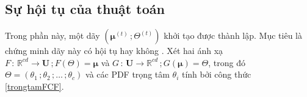 \documentclass[a4paper,oneside]{book} %
\theoremstyle{plain}
\theoremstyle{plain}
\theoremstyle{nonumberplain}
\newcommand{\chy}[1]{\begin{remark}#1\end{remark}}
\begin{document}
%
%
%
%
%
%
%
\subsection{Sự hội tụ của thuật toán}
%
Trong phần này, một dãy ${\left (\bm\mu^{(t)}\,; \Theta^{(t)} \right )}$ khởi tạo được thành lập. Mục tiêu là chứng minh dãy này có hội tụ hay không \cite{bezdek1980convergence,yu2024suppressed}.  Xét hai ánh xạ
 $
F\,:\,\mathbb{R}^{cd} \to \bm U\,; F(\Theta) = \bm\mu$ và 
$G\,:\,\bm U \to \mathbb{R}^{cd} \,; G(\bm\mu)=\Theta$, trong đó $\Theta = (\theta_1\,;\theta_2\,; \ldots\,;\theta_c)$ và các PDF trọng tâm $\theta_i$ tính bởi công thức \eqref{trongtamFCF}. 
\end{document}
